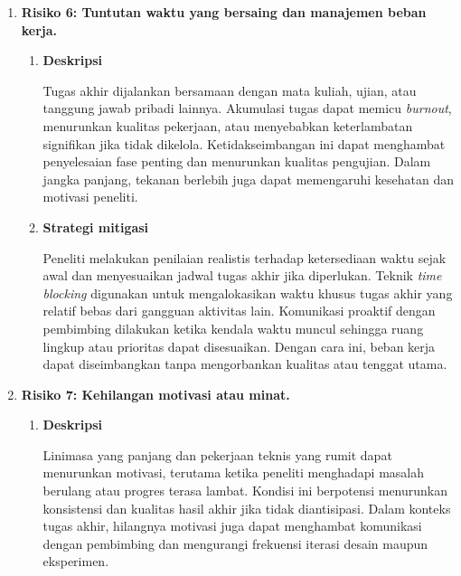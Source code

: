 \begin{enumerate}
    \item \textbf{Risiko 6: Tuntutan waktu yang bersaing dan manajemen beban kerja.}
    
    \vspace{0.5em}
    \begin{enumerate}[label=\alph*)]
        \item \textbf{Deskripsi}
        
        Tugas akhir dijalankan bersamaan dengan mata kuliah, ujian, atau tanggung jawab pribadi lainnya. Akumulasi tugas dapat memicu \textit{burnout}, menurunkan kualitas pekerjaan, atau menyebabkan keterlambatan signifikan jika tidak dikelola. Ketidakseimbangan ini dapat menghambat penyelesaian fase penting dan menurunkan kualitas pengujian. Dalam jangka panjang, tekanan berlebih juga dapat memengaruhi kesehatan dan motivasi peneliti.
        
        \vspace{0.5em}
        
        \item \textbf{Strategi mitigasi}
        
        Peneliti melakukan penilaian realistis terhadap ketersediaan waktu sejak awal dan menyesuaikan jadwal tugas akhir jika diperlukan. Teknik \textit{time blocking} digunakan untuk mengalokasikan waktu khusus tugas akhir yang relatif bebas dari gangguan aktivitas lain. Komunikasi proaktif dengan pembimbing dilakukan ketika kendala waktu muncul sehingga ruang lingkup atau prioritas dapat disesuaikan. Dengan cara ini, beban kerja dapat diseimbangkan tanpa mengorbankan kualitas atau tenggat utama.
        
        \vspace{0.5em}
    \end{enumerate}
    
    \item \textbf{Risiko 7: Kehilangan motivasi atau minat.}
    
    \vspace{0.5em}
    \begin{enumerate}[label=\alph*)]
        \item \textbf{Deskripsi}
        
        Linimasa yang panjang dan pekerjaan teknis yang rumit dapat menurunkan motivasi, terutama ketika peneliti menghadapi masalah berulang atau progres terasa lambat. Kondisi ini berpotensi menurunkan konsistensi dan kualitas hasil akhir jika tidak diantisipasi. Dalam konteks tugas akhir, hilangnya motivasi juga dapat menghambat komunikasi dengan pembimbing dan mengurangi frekuensi iterasi desain maupun eksperimen.
        

\end{enumerate}
\end{enumerate}
